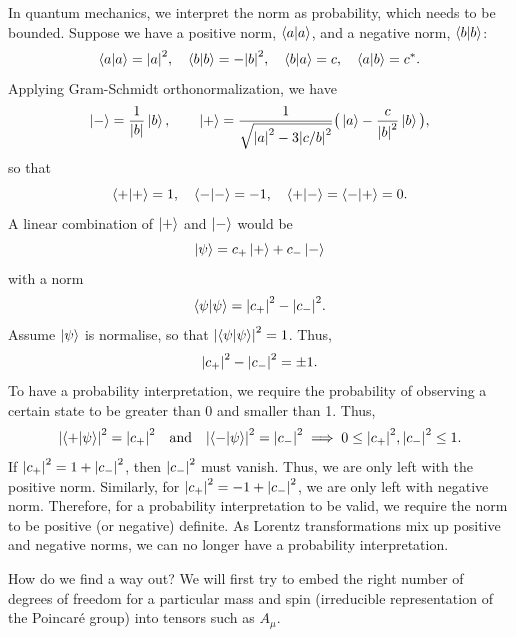 \documentclass[11pt]{article}
\theoremstyle{definition}
\begin{document}
In quantum mechanics, we interpret the norm as probability, which needs to be bounded. Suppose we have a positive norm, $\braket{a}{a}$, and a negative norm, $\braket{b}{b}$:
\begin{equation}
    \braket{a}{a} = \abs{a}^2, \quad
    \braket{b}{b} = -\abs{b}^2, \quad
    \braket{b}{a} = c, \quad
    \braket{a}{b} = c^*.
\end{equation}
Applying Gram-Schmidt orthonormalization, we have
\begin{equation}
    \ket{-} = \frac{1}{\abs{b}}\ket{b}, \qquad \ket{+} = \frac{1}{\sqrt{\abs{a}^2 - 3\abs{c/b}^2}}\big(\ket{a} - \frac{c}{\abs{b}^2}\ket{b}\big),
\end{equation}
so that
\begin{equation}
    \braket{+}{+} = 1, \quad
    \braket{-}{-} = -1, \quad
    \braket{+}{-} =  \braket{-}{+} =0.
\end{equation}
A linear combination of $\ket{+}$ and $\ket{-}$ would be
\begin{equation}
    \ket{\psi} = c_+\ket{+} + c_-\ket{-}
\end{equation}
with a norm
\begin{equation}
    \braket{\psi}{\psi} = \abs{c_+}^2 - \abs{c_-}^2.
\end{equation}
Assume $\ket{\psi}$ is normalise, so that $\abs{\braket{\psi}{\psi}}^2 = 1$. Thus, 
\begin{equation}
    \abs{c_+}^2 - \abs{c_-}^2 = \pm 1.
\end{equation}
To have a probability interpretation, we require the probability of observing a certain state to be greater than 0 and smaller than 1. Thus, 
\begin{equation}
    \abs{\braket{+}{\psi}}^2 = \abs{c_+}^2 \quad \text{and} \quad \abs{\braket{-}{\psi}}^2 = \abs{c_-}^2 \implies 0 \leq \abs{c_+}^2, \abs{c_-}^2 \leq 1.
\end{equation}
If $\abs{c_+}^2 = 1 + \abs{c_-}^2$, then $\abs{c_-}^2$ must vanish. Thus, we are only left with the positive norm. Similarly, for $\abs{c_+}^2 = -1 + \abs{c_-}^2$, we are only left with negative norm. Therefore, for a probability interpretation to be valid, we require the norm to be positive (or negative) definite. As Lorentz transformations mix up positive and negative norms, we can no longer have a probability interpretation.

How do we find a way out? We will first try to embed the right number of degrees of freedom for a particular mass and spin (irreducible representation of the Poincaré group) into tensors such as $A_\mu$.
\end{document}
